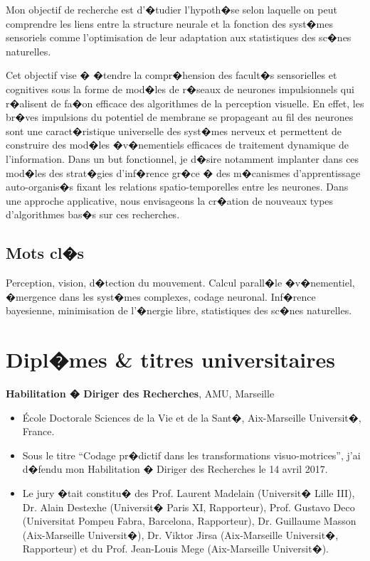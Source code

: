 Mon objectif de recherche est d'�tudier l'hypoth�se selon laquelle on peut comprendre les liens entre la structure neurale et la fonction des syst�mes sensoriels comme l'optimisation de leur adaptation aux statistiques des sc�nes naturelles.

Cet objectif vise � �tendre la compr�hension des facult�s sensorielles et cognitives sous la forme de mod�les de r�seaux de neurones impulsionnels qui r�alisent de fa�on efficace des algorithmes de la perception visuelle. En effet, les br�ves impulsions du potentiel de membrane se propageant au fil des neurones sont une caract�ristique universelle des syst�mes nerveux et permettent de construire des mod�les �v�nementiels efficaces de traitement dynamique de l'information. Dans un but fonctionnel, je d�sire notamment implanter dans ces mod�les des strat�gies d'inf�rence gr�ce � des m�canismes d'apprentissage auto-organis�s fixant les relations spatio-temporelles entre les neurones. Dans une approche applicative, nous envisageons la cr�ation de nouveaux types d'algorithmes bas�s sur ces recherches.

\subsection*{Mots cl�s}
Perception, vision, d�tection du mouvement. Calcul parall�le �v�nementiel, �mergence dans les syst�mes complexes, codage neuronal. Inf�rence bayesienne, minimisation de l'�nergie libre, statistiques des sc�nes naturelles.

\section{Dipl�mes \& titres universitaires}

\textbf{Habilitation � Diriger des Recherches}, AMU, Marseille\hfill {}\\
\vspace*{-.15in}
\begin{itemize}
\item[] \'Ecole Doctorale Sciences de la Vie et de la Sant�, Aix-Marseille Universit�, France.
\item[] Sous le titre ``Codage pr�dictif dans les transformations visuo-motrices'', j'ai d�fendu mon Habilitation � Diriger des Recherches le 14 avril 2017.
\item[] Le jury �tait constitu� des Prof. Laurent Madelain (Universit� Lille III), Dr. Alain Destexhe (Universit� Paris XI, Rapporteur), Prof. Gustavo Deco (Universitat Pompeu Fabra, Barcelona, Rapporteur), Dr. Guillaume Masson (Aix-Marseille Universit�), Dr. Viktor Jirsa (Aix-Marseille Universit�, Rapporteur) et du Prof. Jean-Louis Mege (Aix-Marseille Universit�).
\end{itemize} %



